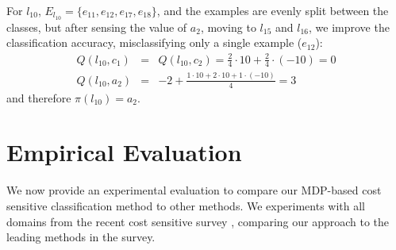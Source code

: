 \documentclass[letterpaper]{article}
\theoremstyle{definition}
\begin{document}
For $l_{10}$, $E_{l_{10}}=\{e_{11},e_{12},e_{17},e_{18} \}$, and the examples are evenly split between the classes, but after sensing the value of $a_2$, moving to $l_{15}$ and $l_{16}$, we improve the classification accuracy, misclassifying only a single example ($e_{12}$):
{\small
\begin{align}
Q(l_{10},c_1) &=& Q(l_{10},c_2) = \frac{2}{4} \cdot 10 + \frac{2}{4} \cdot (-10) = 0\\
Q(l_{10},a_2) &=& -2 + \frac{1 \cdot 10 + 2 \cdot 10 + 1 \cdot (-10)}{4} = 3
\end{align}
}%
and therefore $\pi(l_{10})=a_2$.








\section{Empirical Evaluation}

We now provide an experimental evaluation to compare our MDP-based cost sensitive classification method to other methods. We experiments with all domains from the recent cost sensitive survey \cite{LomaxV13,LomaxV11}, comparing our approach to the leading methods in the survey. 
\end{document}
